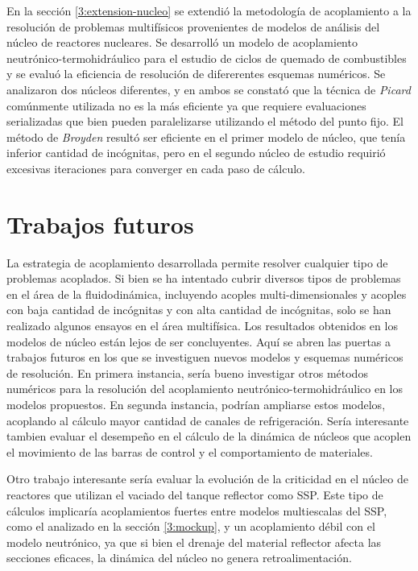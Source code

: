En la sección \ref{3:extension-nucleo} se extendió la metodología de acoplamiento a la resolución de problemas multifísicos provenientes de modelos de análisis del núcleo de reactores nucleares.
Se desarrolló un modelo de acoplamiento neutrónico-termohidráulico para el estudio de ciclos de quemado de combustibles y se evaluó la eficiencia de resolución de difererentes esquemas numéricos.
Se analizaron dos núcleos diferentes, y en ambos se constató que la técnica de \textit{Picard} comúnmente utilizada no es la más eficiente ya que requiere evaluaciones serializadas
que bien pueden paralelizarse utilizando el método del punto fijo.
El método de \textit{Broyden} resultó ser eficiente en el primer modelo de núcleo, que tenía inferior cantidad de incógnitas,
pero en el segundo núcleo de estudio requirió excesivas iteraciones para converger en cada paso de cálculo.


\section{Trabajos futuros}
\label{trabajos-futuros}

La estrategia de acoplamiento desarrollada permite resolver cualquier tipo de problemas acoplados.
Si bien se ha intentado cubrir diversos tipos de problemas en el área de la fluidodinámica,
incluyendo acoples multi-dimensionales y acoples con baja cantidad de incógnitas y con alta cantidad de incógnitas,
solo se han realizado algunos ensayos en el área multifísica.
Los resultados obtenidos en los modelos de núcleo están lejos de ser concluyentes.
Aquí se abren las puertas a trabajos futuros en los que se investiguen nuevos modelos y esquemas numéricos de resolución.
En primera instancia, sería bueno investigar otros métodos numéricos para la resolución del acoplamiento neutrónico-termohidráulico en los modelos propuestos.
En segunda instancia, podrían ampliarse estos modelos, acoplando al cálculo mayor cantidad de canales de refrigeración.
Sería interesante tambien evaluar el desempeño en el cálculo de la dinámica de núcleos que acoplen el movimiento de las barras de control y el comportamiento de materiales.

Otro trabajo interesante sería evaluar la evolución de la criticidad en el núcleo de reactores que utilizan el vaciado del tanque reflector como SSP.
Este tipo de cálculos implicaría acoplamientos fuertes entre modelos multiescalas del SSP, como el analizado en la sección \ref{3:mockup},
y un acoplamiento débil con el modelo neutrónico, ya que si bien el drenaje del material reflector afecta las secciones eficaces,
la dinámica del núcleo no genera retroalimentación.

